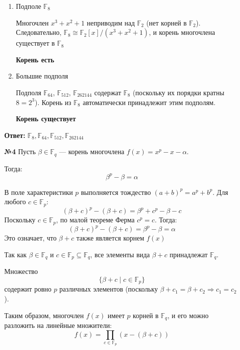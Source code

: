 \documentclass[a4paper]{article}
\begin{document}
\begin{enumerate}
\begin{enumerate}
  \item Подполе \(\mathbb{F}_8\)

  Многочлен \(x^3 + x^2 + 1\) неприводим над \(\mathbb{F}_2\)
   (нет корней в \(\mathbb{F}_2\)). Следовательно, \(\mathbb{F}_8 \cong
    \mathbb{F}_2[x]/(x^3 + x^2 + 1)\), и корень многочлена существует в \(\mathbb{F}_8\)
    
  \textbf{Корень есть}

  \item Большие подполя
  
  Подполя \(\mathbb{F}_{64}\), \(\mathbb{F}_{512}\), \(\mathbb{F}_{262144}\) 
  содержат \(\mathbb{F}_8\) (поскольку их порядки кратны \(8 = 2^3\)). 
  Корень из \(\mathbb{F}_8\) автоматически принадлежит этим подполям.
  
  \textbf{Корень существует}
  \end{enumerate}

  \textbf{Ответ: } $\mathbb{F}_8, \mathbb{F}_{64},
  \mathbb{F}_{512}, \mathbb{F}_{262144}$\\

  \item[\textbf{№4}]
  Пусть $ \beta \in \mathbb{F}_q $ — корень многочлена
  $ f(x) = x^p - x - \alpha $.
  
  Тогда:
  $$
  \beta^p - \beta = \alpha
  $$

  В поле характеристики $ p $ выполняется тождество $(a + b)^p = a^p + b^p$.
   Для любого $ c \in \mathbb{F}_p $:
  $$
  (\beta + c)^p - (\beta + c) = \beta^p + c^p - \beta - c
  $$
  Поскольку $ c \in \mathbb{F}_p $, по малой теореме Ферма $ c^p = c $. Тогда:
  $$
  (\beta + c)^p - (\beta + c) = \beta^p - \beta = \alpha
  $$
  Это означает, что $ \beta + c $ также является корнем $ f(x) $

  
  Так как $ \beta \in \mathbb{F}_q $ и $ c \in \mathbb{F}_p \subseteq 
  \mathbb{F}_q $, все элементы вида $ \beta + c $ принадлежат 
  $ \mathbb{F}_q $. 
  
  Множество 
  $$\{\beta + c \mid c \in \mathbb{F}_p\}$$ 
  содержит ровно $ p $ различных элементов 
  (поскольку $ \beta + c_1 = \beta + c_2 \Rightarrow c_1 = c_2 $).

  Таким образом, многочлен $ f(x) $ имеет $ p $ корней в $ \mathbb{F}_q $,
   и его можно разложить на линейные множители:
  $$
  f(x) = \prod_{c \in \mathbb{F}_p} (x - (\beta + c))
  $$
\end{enumerate}
\end{document}
